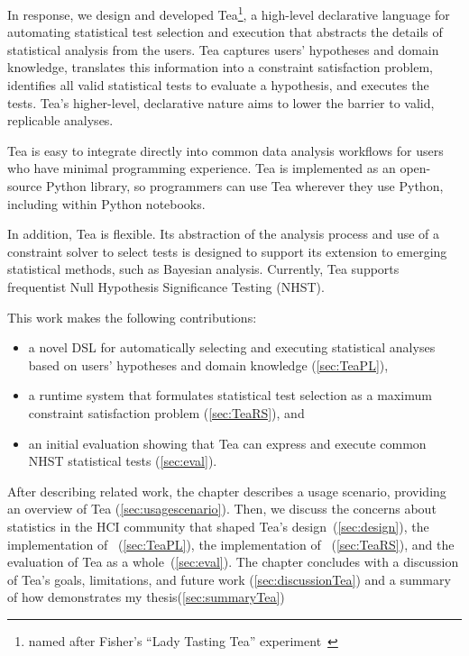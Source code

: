 In response, we design and developed Tea\footnote{named after Fisher's ``Lady
Tasting Tea'' experiment~\cite{fisher1937design}}, a high-level declarative
language for automating statistical test selection and execution that abstracts
the details of statistical analysis from the users. Tea captures users'
hypotheses and domain knowledge, translates this information into a constraint
satisfaction problem, identifies all valid statistical tests to evaluate a
hypothesis, and executes the tests. Tea's higher-level, declarative nature aims
to lower the barrier to valid, replicable analyses.

Tea is easy to integrate directly into common data analysis workflows for users
who have minimal programming experience. Tea is implemented as an open-source
Python library, so programmers can use Tea wherever they use Python, including
within Python notebooks.

In addition, Tea is flexible. Its abstraction of the analysis process and use of
a constraint solver to select tests is designed to support its extension to
emerging statistical methods, such as Bayesian analysis. Currently, Tea supports
frequentist Null Hypothesis Significance Testing (NHST).

This work makes the following contributions:
\begin{itemize}
    \item a novel DSL for automatically selecting and executing statistical
    analyses based on users' hypotheses and domain knowledge
    (\autoref{sec:TeaPL}), 
    \item a runtime system that formulates statistical test selection as a maximum constraint satisfaction problem (\autoref{sec:TeaRS}), and
    \item an initial evaluation showing that Tea can express and execute common NHST statistical tests (\autoref{sec:eval}). 
\end{itemize}

After describing related work, the chapter describes a usage scenario, providing
an overview of Tea (\autoref{sec:usagescenario}). Then, we discuss the concerns
about statistics in the HCI community that shaped Tea's
design~(\autoref{sec:design}), the implementation of
\TeaPL~(\autoref{sec:TeaPL}), the implementation of
\TeaRS~(\autoref{sec:TeaRS}), and the evaluation of Tea as a
whole~(\autoref{sec:eval}). The chapter concludes with a discussion of Tea's
goals, limitations, and future work (\autoref{sec:discussionTea}) and a summary
of how \tea demonstrates my thesis(\autoref{sec:summaryTea})

